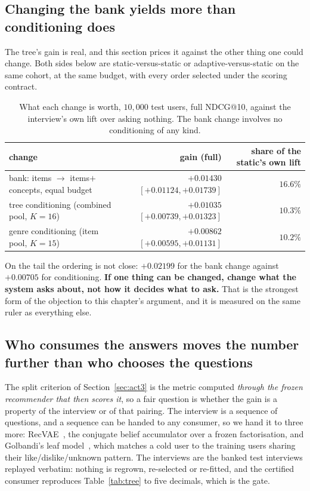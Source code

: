 \documentclass[11pt]{article}
\begin{document}
\subsection{Changing the bank yields more than conditioning does}
\label{sec:bankvsconditioning}

The tree's gain is real, and this section prices it against the other thing one could change. Both sides below are static-versus-static or
adaptive-versus-static on the same cohort, at the same budget, with every order selected under the
scoring contract.

\begin{table}[h]
\centering
\caption{What each change is worth, $10{,}000$ test users, full NDCG@10, against the interview's own
lift over asking nothing. The bank change involves no conditioning of any kind.}
\label{tab:bankdecomp}
\footnotesize
\begin{tabular}{lrr}
\toprule
change & gain (full) & share of the static's own lift \\
\midrule
bank: items $\to$ items$+$concepts, equal budget & $\mathbf{+0.01430}$ $[+0.01124,+0.01739]$ & $16.6\%$ \\
tree conditioning (combined pool, $K{=}16$) & $+0.01035$ $[+0.00739,+0.01323]$ & $10.3\%$ \\
genre conditioning (item pool, $K{=}15$) & $+0.00862$ $[+0.00595,+0.01131]$ & $10.2\%$ \\
\bottomrule
\end{tabular}
\end{table}

On the tail the ordering is not close: $+0.02199$ for the bank change against $+0.00705$ for
conditioning. \textbf{If one thing can be changed, change what the system asks about, not how it
decides what to ask.} That is the strongest form of the objection to this chapter's argument, and it is
measured on the same ruler as everything else.

\subsection{Who consumes the answers moves the number further than who chooses the questions}
\label{sec:consumers}

The split criterion of Section~\ref{sec:act3} is the metric computed \emph{through the frozen
recommender that then scores it}, so a fair question is whether the gain is a property of the
interview or of that pairing. The interview is a sequence of questions, and a sequence can be handed
to any consumer, so we hand it to three more: RecVAE~\cite{ren2020recvae}, the conjugate belief
accumulator over a frozen factorisation, and Golbandi's leaf model~\cite{golbandi2011adaptive}, which
matches a cold user to the training users sharing their like/dislike/unknown pattern. The interviews
are the banked test interviews replayed verbatim: nothing is regrown, re-selected or re-fitted, and
the certified consumer reproduces Table~\ref{tab:tree} to five decimals, which is the gate.
\end{document}
